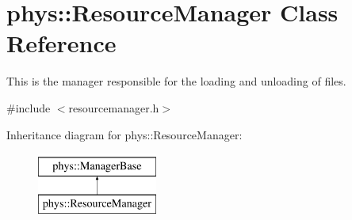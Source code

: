 \hypertarget{classphys_1_1ResourceManager}{
\section{phys::ResourceManager Class Reference}
\label{d1/d35/classphys_1_1ResourceManager}
}


This is the manager responsible for the loading and unloading of files.  




{\ttfamily \#include $<$resourcemanager.h$>$}

Inheritance diagram for phys::ResourceManager:\begin{figure}[H]
\begin{center}
\leavevmode
\includegraphics[height=2.000000cm]{d1/d35/classphys_1_1ResourceManager}
\end{center}
\end{figure}
